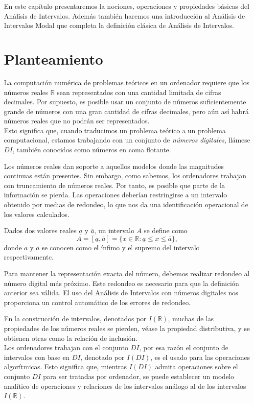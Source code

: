 En este capítulo presentaremos la nociones, operaciones y propiedades básicas del Análisis de Intervalos. Además también haremos una introducción al Análisis de Intervalos Modal que completa la definición clásica de Análisis de Intervalos.

\section{Planteamiento}

La computación numérica de problemas teóricos en un ordenador requiere que los números reales $\mathbb{R}$ sean representados con una cantidad limitada de cifras decimales. Por supuesto, es posible usar un conjunto de números suficientemente grande de números con una gran cantidad de cifras decimales, pero aún así habrá números reales que no podrán ser representados.
\\Esto significa que, cuando traducimos un problema teórico a un problema computacional, estamos trabajando con un conjunto de{ \em números digitales}, llámese $DI$, también conocidos como números en coma flotante.

Los números reales dan soporte a aquellos modelos donde las magnitudes continuas están presentes. Sin embargo, como sabemos, los ordenadores trabajan con truncamiento de números reales. Por tanto, es posible que parte de la información se pierda. Las operaciones deberían restringirse a un intervalo obtenido por medias de redondeo, lo que nos da una identificación operacional de los valores calculados.

Dados dos valores reales $\underline{a}$ y $\overline{a}$, un intervalo $A$ se define como
\begin{equation}
A = [\underline{a},\overline{a}] = \{ x \in \mathbb{R} : \underline{a} \leq x \leq \overline{a} \},
\nonumber
\end{equation}
donde $\underline{a}$ y $\overline{a}$ se conocen como el ínfimo y el supremo del intervalo respectivamente.

Para mantener la representación exacta del número, debemos realizar redondeo al número digital más próximo. Este redondeo es necesario para que la definición anterior sea válida. El uso del Análisis de Intervalos con números digitales nos proporciona un control automático de los errores de redondeo.

En la construcción de intervalos, denotados por $I(\mathbb{R})$, muchas de las propiedades de los números reales se pierden, véase la propiedad distributiva, y se obtienen otras como la relación de inclusión.
\\ Los ordenadores trabajan con el conjunto $DI$, por esa razón el conjunto de intervalos con base en $DI$, denotado por $I(DI)$, es el usado para las operaciones algorítmicas. Esto significa que, mientras $I(DI)$ admita operaciones sobre el conjunto $DI$ para ser tratadas por ordenador, se puede establecer un modelo analítico de operaciones y relaciones de los intervalos análogo al de los intervalos $I(\mathbb{R})$.

